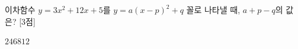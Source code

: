 이차함수 $y=3x^2+12x+5$를 $y=a(x-p)^2+q$ 꼴로 나타낼 때, $a+p-q$의 값은?  \mbox{[3점]}
\begin{choices32}{$2$}{$4$}{$6$}{$8$}{$12$}\end{choices32}
